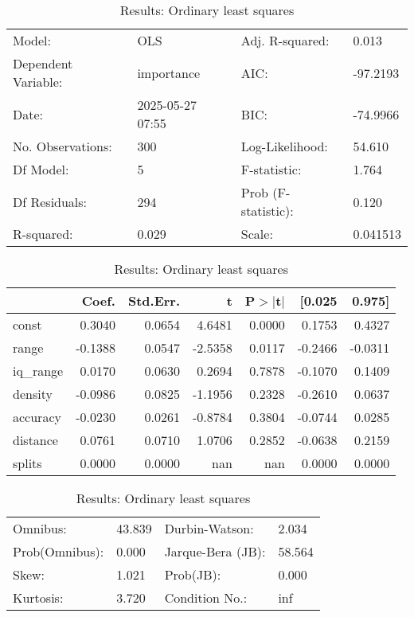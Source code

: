 \begin{table}
\caption{Results: Ordinary least squares}
\label{}
\begin{center}
\begin{tabular}{llll}
\hline
Model:              & OLS              & Adj. R-squared:     & 0.013     \\
Dependent Variable: & importance       & AIC:                & -97.2193  \\
Date:               & 2025-05-27 07:55 & BIC:                & -74.9966  \\
No. Observations:   & 300              & Log-Likelihood:     & 54.610    \\
Df Model:           & 5                & F-statistic:        & 1.764     \\
Df Residuals:       & 294              & Prob (F-statistic): & 0.120     \\
R-squared:          & 0.029            & Scale:              & 0.041513  \\
\hline
\end{tabular}
\end{center}

\begin{center}
\begin{tabular}{lrrrrrr}
\hline
          &   Coef. & Std.Err. &       t & P$> |$t$|$ &  [0.025 &  0.975]  \\
\hline
const     &  0.3040 &   0.0654 &  4.6481 &      0.0000 &  0.1753 &  0.4327  \\
range     & -0.1388 &   0.0547 & -2.5358 &      0.0117 & -0.2466 & -0.0311  \\
iq\_range &  0.0170 &   0.0630 &  0.2694 &      0.7878 & -0.1070 &  0.1409  \\
density   & -0.0986 &   0.0825 & -1.1956 &      0.2328 & -0.2610 &  0.0637  \\
accuracy  & -0.0230 &   0.0261 & -0.8784 &      0.3804 & -0.0744 &  0.0285  \\
distance  &  0.0761 &   0.0710 &  1.0706 &      0.2852 & -0.0638 &  0.2159  \\
splits    &  0.0000 &   0.0000 &     nan &         nan &  0.0000 &  0.0000  \\
\hline
\end{tabular}
\end{center}

\begin{center}
\begin{tabular}{llll}
\hline
Omnibus:       & 43.839 & Durbin-Watson:    & 2.034   \\
Prob(Omnibus): & 0.000  & Jarque-Bera (JB): & 58.564  \\
Skew:          & 1.021  & Prob(JB):         & 0.000   \\
Kurtosis:      & 3.720  & Condition No.:    & inf     \\
\hline
\end{tabular}
\end{center}
\end{table}
